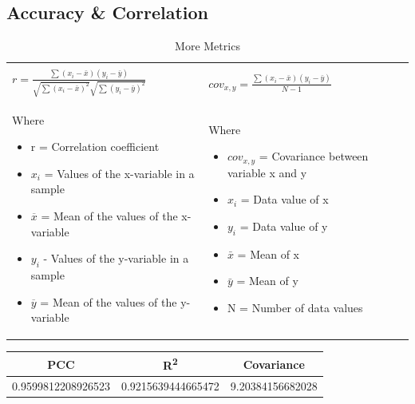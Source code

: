\documentclass[12pt]{mcmthesis}
\begin{document}
    \subsection{Accuracy \& Correlation}

    \begin{table}[h]
        \begin{tabular}{|*2{p{}|}}
            \hline & \\
            \quad ${\displaystyle r={\frac {\sum (x_{i}-{\bar {x}})(y_{i}-{\bar {y}})}{{\sqrt {\sum (x_{i}-{\bar {x}})^{2}}}{\sqrt {\sum (y_{i}-{\bar {y}})^{2}}}}}}$ & ${\displaystyle cov_{x,y}={\frac {\sum (x_{i}-{\bar {x}})(y_{i}-{\bar {y}})}{{N-1}}}}$\\[\baselineskip]
            Where
            \begin{itemize}[nosep]
                \item {r} = Correlation coefficient
                \item ${x_i}$ = Values of the x-variable in a sample
                \item ${\overline x}$ = Mean of the values of the x-variable
                \item ${y_i}$ - Values of the y-variable in a sample
                \item ${\overline y}$ = Mean of the values of the y-variable
            \end{itemize}
            &
            Where
            \begin{itemize}[nosep]
                \item ${cov_{x,y}}$ = Covariance between variable x and y
                \item ${x_i}$ = Data value of x
                \item ${y_i}$ = Data value of y
                \item ${\bar{x}}$ = Mean of x
                \item ${\bar{y}}$ = Mean of y
                \item {N} = Number of data values
            \end{itemize}
            \\
            \hline
        \end{tabular}
        \caption{More Metrics}
        \label{tab:mm}
    \end{table}%
    \begin{table}[H]
        \centering
        \begin{tabular}{ |c|c|c|}
            \hline
            \textbf{PCC} & \textbf{R\textsuperscript{2}} & \textbf{Covariance}\\
            \hline
            0.9599812208926523 & 0.9215639444665472 & 9.20384156682028\\
            \hline
        \end{tabular}
    \end{table}
\end{document}
